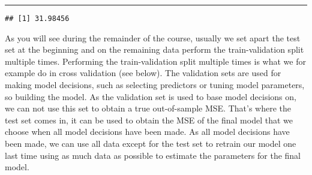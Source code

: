 \documentclass[
  12pt,
]{article}
\newenvironment{Shaded}{\begin{snugshade}}{\end{snugshade}}
\newcommand{\AttributeTok}[1]{\textcolor[rgb]{0.13,0.29,0.53}{#1}}
\newcommand{\CommentTok}[1]{\textcolor[rgb]{0.56,0.35,0.01}{\textit{#1}}}
\newcommand{\FunctionTok}[1]{\textcolor[rgb]{0.13,0.29,0.53}{\textbf{#1}}}
\newcommand{\NormalTok}[1]{#1}
\newcommand{\OtherTok}[1]{\textcolor[rgb]{0.56,0.35,0.01}{#1}}
\newcommand{\SpecialCharTok}[1]{\textcolor[rgb]{0.81,0.36,0.00}{\textbf{#1}}}
\begin{document}
\begin{center}\rule{0.5\linewidth}{0.5pt}\end{center}

\begin{Shaded}
\end{Shaded}

\begin{verbatim}
## [1] 31.98456
\end{verbatim}

As you will see during the remainder of the course, usually we set apart
the test set at the beginning and on the remaining data perform the
train-validation split multiple times. Performing the train-validation
split multiple times is what we for example do in cross validation (see
below). The validation sets are used for making model decisions, such as
selecting predictors or tuning model parameters, so building the model.
As the validation set is used to base model decisions on, we can not use
this set to obtain a true out-of-sample MSE. That's where the test set
comes in, it can be used to obtain the MSE of the final model that we
choose when all model decisions have been made. As all model decisions
have been made, we can use all data except for the test set to retrain
our model one last time using as much data as possible to estimate the
parameters for the final model.
\end{document}
